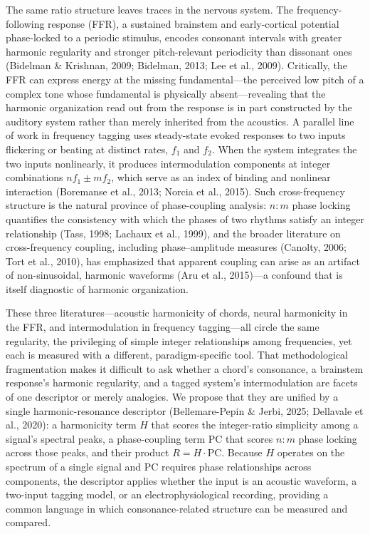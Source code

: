 \documentclass[11pt]{article}
\begin{document}
The same ratio structure leaves traces in the nervous system. The frequency-following response (FFR), a sustained brainstem and early-cortical potential phase-locked to a periodic stimulus, encodes consonant intervals with greater harmonic regularity and stronger pitch-relevant periodicity than dissonant ones (Bidelman \& Krishnan, 2009; Bidelman, 2013; Lee et al., 2009). Critically, the FFR can express energy at the missing fundamental---the perceived low pitch of a complex tone whose fundamental is physically absent---revealing that the harmonic organization read out from the response is in part constructed by the auditory system rather than merely inherited from the acoustics. A parallel line of work in frequency tagging uses steady-state evoked responses to two inputs flickering or beating at distinct rates, $f_1$ and $f_2$. When the system integrates the two inputs nonlinearly, it produces intermodulation components at integer combinations $n f_1 \pm m f_2$, which serve as an index of binding and nonlinear interaction (Boremanse et al., 2013; Norcia et al., 2015). Such cross-frequency structure is the natural province of phase-coupling analysis: $n{:}m$ phase locking quantifies the consistency with which the phases of two rhythms satisfy an integer relationship (Tass, 1998; Lachaux et al., 1999), and the broader literature on cross-frequency coupling, including phase--amplitude measures (Canolty, 2006; Tort et al., 2010), has emphasized that apparent coupling can arise as an artifact of non-sinusoidal, harmonic waveforms (Aru et al., 2015)---a confound that is itself diagnostic of harmonic organization.

These three literatures---acoustic harmonicity of chords, neural harmonicity in the FFR, and intermodulation in frequency tagging---all circle the same regularity, the privileging of simple integer relationships among frequencies, yet each is measured with a different, paradigm-specific tool. That methodological fragmentation makes it difficult to ask whether a chord's consonance, a brainstem response's harmonic regularity, and a tagged system's intermodulation are facets of one descriptor or merely analogies. We propose that they are unified by a single harmonic-resonance descriptor (Bellemare-Pepin \& Jerbi, 2025; Dellavale et al., 2020): a harmonicity term $H$ that scores the integer-ratio simplicity among a signal's spectral peaks, a phase-coupling term $\mathrm{PC}$ that scores $n{:}m$ phase locking across those peaks, and their product $R=H\cdot\mathrm{PC}$. Because $H$ operates on the spectrum of a single signal and $\mathrm{PC}$ requires phase relationships across components, the descriptor applies whether the input is an acoustic waveform, a two-input tagging model, or an electrophysiological recording, providing a common language in which consonance-related structure can be measured and compared.
\end{document}
